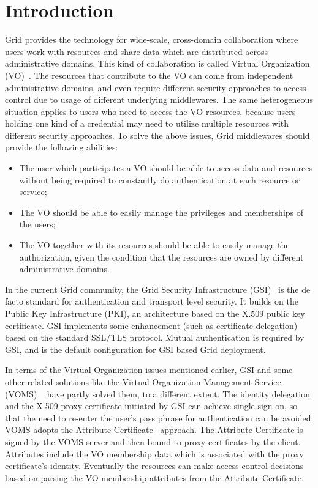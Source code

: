 \documentclass[twocolumn]{svjour3}         %
\begin{document}
\section{Introduction} 
\label{sec:intro}
Grid provides the technology for wide-scale, cross-domain collaboration where users work with resources and share data which are distributed across administrative domains. This kind of collaboration is called Virtual Organization (VO)~\cite{IFoster01}. The resources that contribute to the VO can come from independent administrative domains, and even require different security approaches to access control due to usage of different underlying middlewares. The same heterogeneous situation applies to users who need to access the VO resources, because users holding one kind of a credential may need to utilize multiple resources with different security approaches. To solve the above issues, Grid middlewares should provide the following abilities:
\begin{itemize}
\item The user which participates a VO should be able to access data and resources without being required to constantly do authentication at each resource or service;
\item The VO should be able to easily manage the privileges and memberships of the users;
\item The VO together with its resources should be able to easily manage the authorization, given the condition that the resources are owned by different administrative domains.
\end{itemize}
In the current Grid community, the Grid Security Infrastructure (GSI)~\cite{IFoster98} is the de facto standard for authentication and transport level security. It builds on the Public Key Infrastructure (PKI), an architecture based on the X.509 public key certificate. GSI implements some enhancement (such as certificate delegation) based on the standard SSL/TLS protocol. Mutual authentication is required by GSI, and is the default configuration for GSI based Grid deployment.

In terms of the Virtual Organization issues mentioned earlier, GSI and some other related solutions like the Virtual Organization Management Service (VOMS) ~\cite{AlfieriR05} have partly solved them, to a different extent. The identity delegation and the X.509 proxy certificate initiated by GSI can achieve single sign-on, so that the need to re-enter the user’s pass phrase for authentication can be avoided. VOMS adopts the Attribute Certificate~\cite{RFC3821link} approach. The Attribute Certificate is signed by the VOMS server and then bound to proxy certificates by the client. Attributes include the VO membership data which is associated with the proxy certificate’s identity. Eventually the resources can make access control decisions based on parsing the VO membership attributes from the Attribute Certificate.
\end{document}
